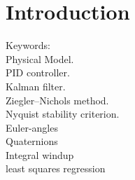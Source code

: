 \section{Introduction}

Keywords:\\
Physical Model.\\
PID controller.\\
Kalman filter.\\
Ziegler–Nichols method.\\
Nyquist stability criterion.\\
Euler-angles\\
Quaternions\\
Integral windup\\
least squares regression\\


